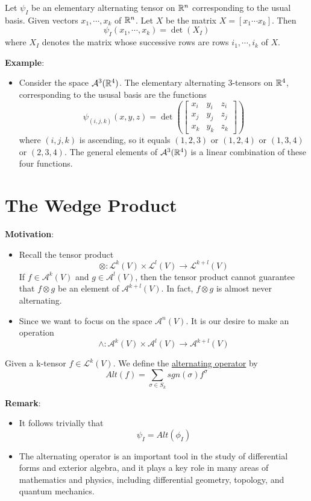 \begin{theorem}
    Let $\psi_I$ be an elementary alternating tensor on $\mathbb{R}^n$ corresponding to the usual basis. Given vectors $x_1,\cdots,x_k$ of $\mathbb{R}^n$. Let $X$ be the matrix $X=[x_1 \cdots x_k]$. Then 
    $$\psi_I(x_1,\cdots,x_k)=\det(X_I)$$
    where $X_I$ denotes the matrix whose successive rows are rows $i_1,\cdots,i_k$ of $X$.
\end{theorem}
\noindent\textbf{Example}:
\begin{itemize}
    \item Consider the space $\mathcal{A}^3(\mathbb{R}^4)$. The elementary alternating 3-tensors on $\mathbb{R}^4$, corresponding to the ususal basis are the functions 
    \begin{equation*}
        \psi_{(i,j,k)}(x,y,z)= \det(\begin{bmatrix}
            x_i & y_i & z_i\\
            x_j & y_j & z_j\\
            x_k & y_k & z_k
        \end{bmatrix})
    \end{equation*}
    where $(i,j,k)$ is ascending, so it equals $(1,2,3)$ or $(1,2,4)$ or $(1,3,4)$ or $(2,3,4)$. 
    The general elements of $\mathcal{A}^3(\mathbb{R}^4)$ is a linear combination of these four functions.
\end{itemize}

\section{The Wedge Product}

\noindent \textbf{Motivation}:
\begin{itemize}
    \item Recall the tensor product $$\otimes:\mathcal{L}^k(V)\times\mathcal{L}^l(V)\longrightarrow\mathcal{L}^{k+l}(V)$$ If $f\in\mathcal{A}^k(V)$ and $g\in\mathcal{A}^l(V)$, then the tensor product cannot guarantee that $f\otimes g$ be an element of $\mathcal{A}^{k+l}(V)$. In fact, $f\otimes g$ is almost never alternating. 
    \item Since we want to focus on the space $\mathcal{A}^n(V)$. It is our desire to make an operation $$\wedge : \mathcal{A}^k(V)\times \mathcal{A}^l(V)\longrightarrow\mathcal{A}^{k+l}(V)$$
\end{itemize}


\begin{definition}
    Given a k-tensor $f\in \mathcal{L}^k(V)$. We define the \underline{alternating operator} by 
    $$Alt(f)=\sum_{\sigma\in S_k}sgn(\sigma)f^{\sigma}$$ 
\end{definition}
\noindent\textbf{Remark}:
\begin{itemize}
    \item It follows trivially that $$\psi_I=Alt(\phi_I)$$
    \item The alternating operator is an important tool in the study of differential forms and exterior algebra, and it plays a key role in many areas of mathematics and physics, including differential geometry, topology, and quantum mechanics.
\end{itemize}

